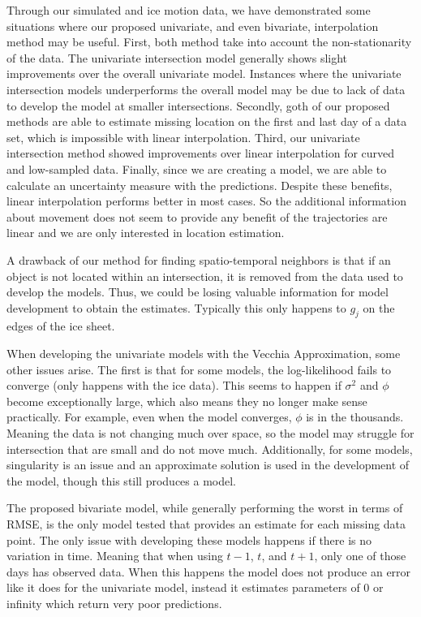 \documentclass[12pt]{article}
\begin{document}
Through our simulated and ice motion data, we have demonstrated some
situations where our proposed univariate, and even bivariate,
interpolation method may be useful. First, both method take into account
the non-stationarity of the data. The univariate intersection model
generally shows slight improvements over the overall univariate model.
Instances where the univariate intersection models underperforms the
overall model may be due to lack of data to develop the model at smaller
intersections. Secondly, goth of our proposed methods are able to
estimate missing location on the first and last day of a data set, which
is impossible with linear interpolation. Third, our univariate
intersection method showed improvements over linear interpolation for
curved and low-sampled data. Finally, since we are creating a model, we
are able to calculate an uncertainty measure with the predictions.
Despite these benefits, linear interpolation performs better in most
cases. So the additional information about movement does not seem to
provide any benefit of the trajectories are linear and we are only
interested in location estimation.

A drawback of our method for finding spatio-temporal neighbors is that
if an object is not located within an intersection, it is removed from
the data used to develop the models. Thus, we could be losing valuable
information for model development to obtain the estimates. Typically
this only happens to \(g_j\) on the edges of the ice sheet.

When developing the univariate models with the Vecchia Approximation,
some other issues arise. The first is that for some models, the
log-likelihood fails to converge (only happens with the ice data). This
seems to happen if \(\sigma^2\) and \(\phi\) become exceptionally large,
which also means they no longer make sense practically. For example,
even when the model converges, \(\phi\) is in the thousands. Meaning the
data is not changing much over space, so the model may struggle for
intersection that are small and do not move much. Additionally, for some
models, singularity is an issue and an approximate solution is used in
the development of the model, though this still produces a model.

The proposed bivariate model, while generally performing the worst in
terms of RMSE, is the only model tested that provides an estimate for
each missing data point. The only issue with developing these models
happens if there is no variation in time. Meaning that when using
\(t-1\), \(t\), and \(t+1\), only one of those days has observed data.
When this happens the model does not produce an error like it does for
the univariate model, instead it estimates parameters of 0 or infinity
which return very poor predictions.
\end{document}
